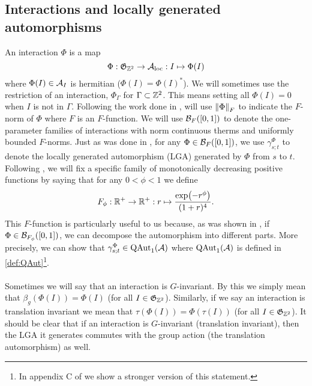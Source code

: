 \documentclass[11pt,a4paper,twoside]{article}
\numberwithin{equation}{section}
\begin{document}
	\subsection{Interactions and locally generated automorphisms}\label{sec:Interactions}
	An interaction $\Phi$ is a map
	\begin{equation}
		\Phi: \mathfrak{G}_{\ZZ^2}\rightarrow \AA_{\text{loc}}: I \mapsto \Phi(I)
	\end{equation}
	where $\Phi(I)\in\AA_I$ is hermitian ($\Phi(I)=\Phi(I)^*$). We will sometimes use the restriction of an interaction, $\Phi_\Gamma$ for $\Gamma\subset\ZZ^2$. This means setting all $\Phi(I)=0$ when $I$ is not in $\Gamma$. Following the work done in \cite{doi:10.1063/1.5095769}, will use $\norm{\Phi}_F$ to indicate the $F$-norm of $\Phi$ where $F$ is an $F$-function. We will use $\BB_{F}([0,1])$ to denote the one-parameter families of interactions with norm continuous therms and uniformly bounded $F$-norms. Just as was done in \cite{doi:10.1063/1.5095769}, for any $\Phi\in \BB_{F}([0,1])$, we use $\gamma^{\Phi}_{s;t}$ to denote the locally generated automorphism (LGA) generated by $\Phi$ from $s$ to $t$. Following \cite{ogata2021h3gmathbb}, we will fix a specific family of monotonically decreasing positive functions by saying that for any $0<\phi<1$ we define
	\begin{equation}\label{eq:OurFFunction}
		F_\phi:\RR^+\rightarrow\RR^+:r\mapsto \frac{\exp(-r^\phi)}{(1+r)^4}.
	\end{equation}
	This $F$-function is particularly useful to us because, as was shown in \cite{ogata2021h3gmathbb}, if $\Phi\in\BB_{F_\phi}([0,1])$, we can decompose the automorphism into different parts. More precisely, we can show that $\gamma^{\Phi}_{s;t}\in\QAut{\AA}$ where $\QAut{\AA}$ is defined in \ref{def:QAut}\footnote{In appendix C of \cite{jappens2023spt} we show a stronger version of this statement.}.
	\\\\
	Sometimes we will say that an interaction is $G$-invariant. By this we simply mean that $\beta_g(\Phi(I))=\Phi(I)$ (for all $I\in\mathfrak{G}_{\ZZ^2}$). Similarly, if we say an interaction is translation invariant we mean that $\tau(\Phi(I))=\Phi(\tau(I))$ (for all $I\in\mathfrak{G}_{\ZZ^2}$). It should be clear that if an interaction is $G$-invariant (translation invariant), then the LGA it generates commutes with the group action (the translation automorphism) as well.
\end{document}
